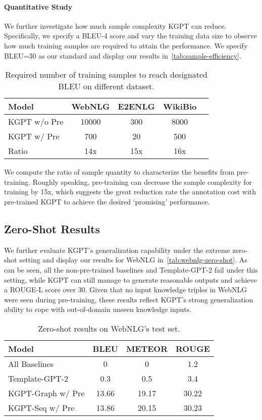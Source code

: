\documentclass[11pt,a4paper]{article}
\newcommand{\model}{KGPT\xspace}
\begin{document}
\paragraph{Quantitative Study}
We further investigate how much sample complexity \model can reduce. Specifically, we specify a BLEU-4 score and vary the training data size to observe how much training samples are required to attain the performance. We specify BLEU=30 as our standard and display our results in~\autoref{tab:sample-efficiency}.
\begin{table}[!thb]
\centering
\small
\begin{tabular}{lcccc}
\hline
Model & WebNLG & E2ENLG & WikiBio\\
\hline
\model w/o Pre  & 10000  &  300    & 8000   &  \\
\model w/ Pre  & 700   &   20    &  500  &  \\
Ratio &   14x & 15x  & 16x \\
\hline
\end{tabular}
\caption{Required number of training samples to reach designated BLEU on different dataset.}
\label{tab:sample-efficiency}
\vspace{-1ex}
\end{table}
We compute the ratio of sample quantity to characterize the benefits from pre-training. Roughly speaking, pre-training can decrease the sample complexity for training by 15x, which suggests the great reduction rate the annotation cost with pre-trained \model to achieve the desired `promising' performance. 

\subsection{Zero-Shot Results}
We further evaluate \model's generalization capability under the extreme zero-shot setting and display our results for WebNLG in~\autoref{tab:webnlg-zero-shot}. As can be seen, all the non-pre-trained baselines and Template-GPT-2 fail under this setting, while \model can still manage to generate reasonable outputs and achieve a ROUGE-L score over 30. Given that no input knowledge triples in WebNLG were seen during pre-training, these results reflect \model's strong generalization ability to cope with out-of-domain unseen knowledge inputs.
\begin{table}[!thb]
\centering
\small
\begin{tabular}{lccc}
\hline
Model & BLEU & METEOR & ROUGE\\
\hline
All Baselines & 0 & 0 & 1.2 \\
Template-GPT-2 & 0.3  & 0.5 & 3.4 \\
\hline
\model-Graph w/ Pre   & 13.66 & 19.17 & 30.22 \\
\model-Seq w/ Pre & 13.86 & 20.15 & 30.23 \\
\hline
\end{tabular}
\caption{Zero-shot results on WebNLG's test set. }
\label{tab:webnlg-zero-shot}
\end{table}
\end{document}
